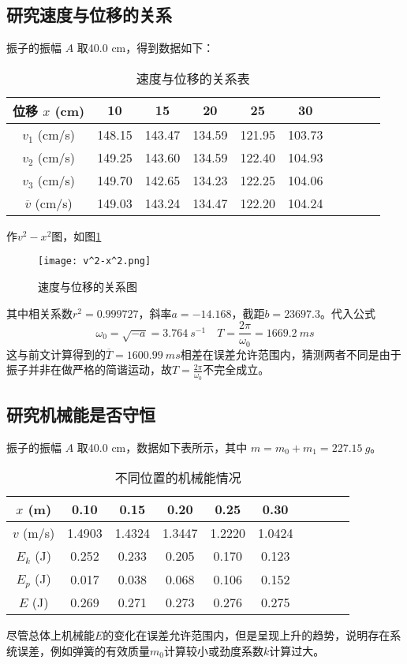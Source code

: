 \documentclass[11pt]{article}
\begin{document}
	\subsection{研究速度与位移的关系}
	振子的振幅 $A$ 取40.0 cm，得到数据如下：
	\begin{table}[H]\centering
		\caption{速度与位移的关系表}
		\label{速度与位移的关系}
		\begin{tabular}{cccccccccc}\toprule
			位移 $x$ (cm) & 10 & 15 & 20 & 25 & 30  \\
			\midrule
			$v_1$ (cm/s) &148.15	&143.47	&134.59	&121.95	&103.73 \\
			$v_2$ (cm/s) &149.25	&143.60	&134.59	&122.40	&104.93 \\
			$v_3$ (cm/s) &149.70	&142.65	&134.23	&122.25	&104.06 \\
			$\overline{v}$ (cm/s) &149.03	&143.24	&134.47	&122.20	&104.24 \\
			\bottomrule
		\end{tabular}
	\end{table}
	作$v^2-x^2$图，如图\ref{fig:v^2-x^2}
	\begin{figure}[H]
		\centering
		\texttt{[image: v^2-x^2.png]}
		\caption{速度与位移的关系图}
		\label{fig:v^2-x^2}
	\end{figure}
	其中相关系数$r^2=0.999727$，斜率$a=-14.168$，截距$b=23697.3$。代入公式
	\[\omega_0=\sqrt{-a}=\SI{3.764}{s^{-1}} \quad T=\frac{2\pi}{\omega_0}=\SI{1669.2}{ms}\]
	这与前文计算得到的$\overline{T}=\SI{1600.99}{ms}$相差在误差允许范围内，猜测两者不同是由于振子并非在做严格的简谐运动，故$T=\frac{2\pi}{\omega_0}$不完全成立。
	
	\subsection{研究机械能是否守恒}
	振子的振幅 $A$ 取40.0 cm，数据如下表所示，其中 $m = m_0 + m_1 = \SI{227.15}{g}$。
	\begin{table}[H]\centering
		\caption{不同位置的机械能情况}
		\label{不同位置的机械能情况}
		\begin{tabular}{cccccccccc}\toprule
			$x$ (m) & 0.10 & 0.15 & 0.20 & 0.25 & 0.30  \\
			\midrule
			$v$ (m/s) &1.4903	&1.4324	&1.3447	&1.2220	&1.0424 \\
			$E_k$ (J)&0.252	&0.233	&0.205	&0.170	&0.123 \\
			$E_p$ (J)&0.017	&0.038	&0.068	&0.106	&0.152 \\
			$E$ (J)&0.269	&0.271	&0.273	&0.276	&0.275 \\
			\bottomrule
		\end{tabular}
	\end{table}
	尽管总体上机械能$E$的变化在误差允许范围内，但是呈现上升的趋势，说明存在系统误差，例如弹簧的有效质量$m_0$计算较小或劲度系数$k$计算过大。
	
\end{document}
